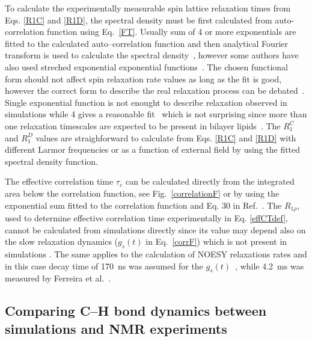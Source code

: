 \documentclass[aps,prl,superscriptaddress,twocolumn]{revtex4}
\begin{document}
To calculate the experimentally measurable spin lattice relaxation times from Eqs. \ref{R1C} and \ref{R1D}, 
the spectral density must be first calculated from auto-correlation function using Eq.~\ref{FT}. 
Usually sum of 4 or more exponentials are fitted to the calculated auto--correlation function and then 
analytical Fourier transform is used to calculate the spectral 
density~\cite{pastor88,venable93,pastor02,eldho03,ollila07a,ferreira15},
however some authors have also used streched exponential exponential functions~\cite{lindahl01,wohlert06}.
The chosen functional form should not affect spin relaxation rate values as long as the fit is good, however 
the correct form to describe the real relaxation process can be debated~\cite{leftin11,wohlert06,edholm08,klauda08a,klauda08c}. 
Single exponential function is not enought to describe relaxation observed in simulations while 4 gives a reasonable 
fit~\cite{eldho03} which is not surprising since more than one relaxation timescales are expected to be present in bilayer
lipids~\cite{pastor88,venable93,pastor02,leftin11}. The $R_{1}^{C}$ and $R_{1}^{D}$ values are straighforward to
calculate from Eqs. \ref{R1C} and \ref{R1D} with different Larmor frequencies or as a function of external
field by using the fitted spectral density function.

The effective correlation time $\tau_e$ can be calculated directly from the integrated area below the correlation 
function, see Fig.~\ref{correlationF} or by using the exponential sum fitted to the correlation function and  
Eq. 30 in Ref.~\cite{ferreira15}. The $R_{1\rho}$, used to determine effective correlation time experimentally 
in Eq. \ref{effCTdef}, cannot be calculated from simulations directly since its value may depend
also on the slow relaxation dynamics ($g_s(t)$ in Eq.~\ref{corrF}) which is not present in simulations \cite{ferreira15}.
The same applies to the calculation of NOESY relaxations rates and in this case decay time of 170~ns was assumed for the
$g_s(t)$~\cite{feller99}, while 4.2~ms was measured by Ferreira et al.~\cite{ferreira15}.



\subsection{Comparing C--H bond dynamics between simulations and NMR experiments}
\end{document}
